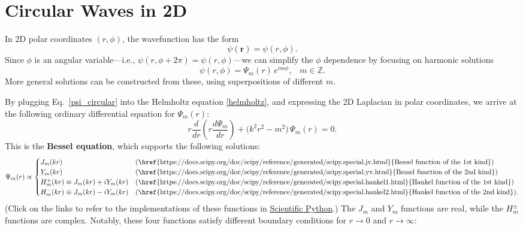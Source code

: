 \documentclass[pra,12pt]{revtex4}
\begin{document}
\section{Circular Waves in 2D}

In 2D polar coordinates $(r, \phi)$, the wavefunction has the form
\begin{equation}
  \psi(\mathbf{r}) = \psi(r,\phi).
\end{equation}
Since $\phi$ is an angular variable---i.e., $\psi(r,\phi + 2\pi) =
\psi(r, \phi)$---we can simplify the $\phi$ dependence by focusing on
harmonic solutions
\begin{equation}
  \psi(r,\phi) = \Psi_m(r)\, e^{im\phi}, \;\;\;m \in\mathbb{Z}.
  \label{psi_circular}
\end{equation}
More general solutions can be constructed from these, using
superpositions of different $m$.

By plugging Eq.~\eqref{psi_circular} into the Helmholtz equation
\eqref{helmholtz}, and expressing the 2D Laplacian in polar
coordinates, we arrive at the following ordinary differential equation
for $\Psi_m(r)$:
\begin{equation}
  r \frac{d}{dr}\!\left(r \frac{d\Psi_m}{dr} \right)
  + \Big(k^2 r^2 - m^2 \Big)\, \Psi_m(r) = 0.
  \label{besseleq}
\end{equation}
This is the \textbf{Bessel equation}, which supports the following
solutions:
\begin{equation}
  \Psi_m(r) \propto \begin{cases}
    J_m(kr) &\text{(\href{https://docs.scipy.org/doc/scipy/reference/generated/scipy.special.jv.html}{Bessel function of the 1st kind})} \\
    Y_m(kr) &\text{(\href{https://docs.scipy.org/doc/scipy/reference/generated/scipy.special.yv.html}{Bessel function of the 2nd kind})} \\
    H_m^+(kr) \equiv J_m(kr) + i Y_m(kr) &\text{(\href{https://docs.scipy.org/doc/scipy/reference/generated/scipy.special.hankel1.html}{Hankel function of the 1st kind})} \\
    H_m^-(kr) \equiv J_m(kr) - i Y_m(kr) &\text{(\href{https://docs.scipy.org/doc/scipy/reference/generated/scipy.special.hankel2.html}{Hankel function of the 2nd kind})}.
  \end{cases}
\end{equation}
(Click on the links to refer to the implementations of these functions
in \href{https://scipy.org/}{Scientific Python}.)  The $J_m$ and $Y_m$
functions are real, while the $H_m^\pm$ functions are complex.
Notably, these four functions satisfy different boundary conditions
for $r\rightarrow 0$ and $r \rightarrow \infty$:
\end{document}
